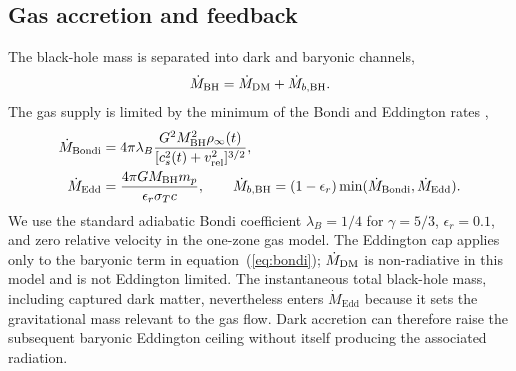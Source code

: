 \documentclass[11pt]{article}
\newcommand{\Bondi}{\mathrm{Bondi}}
\newcommand{\Edd}{\mathrm{Edd}}
\begin{document}
\subsection{Gas accretion and feedback}

The black-hole mass is separated into dark and baryonic channels,
\begin{equation}
 \dot M_{\rm BH}=\dot M_{\rm DM}+\dot M_{b,{\rm BH}} .
\end{equation}
The gas supply is limited by the minimum of the Bondi and Eddington rates \citep{Bondi1952},
\begin{align}
 \dot M_{\Bondi} &=4\pi\lambda_B\frac{G^2M_{\rm BH}^2\rho_{\infty}(t)}{[c_s^2(t)+v_{\rm rel}^2]^{3/2}}, \\
 \dot M_{\Edd}&=\frac{4\pi G M_{\rm BH}m_p}{\epsilon_r\sigma_T c},\qquad
 \dot M_{b,{\rm BH}}=(1-\epsilon_r)\min(\dot M_{\Bondi},\dot M_{\Edd}) .
 \label{eq:bondi}
\end{align}
We use the standard adiabatic Bondi coefficient $\lambda_B=1/4$ for $\gamma=5/3$, $\epsilon_r=0.1$, and zero relative velocity in the one-zone gas model.  The Eddington cap applies only to the baryonic term in equation~(\ref{eq:bondi}); $\dot M_{\rm DM}$ is non-radiative in this model and is not Eddington limited.  The instantaneous total black-hole mass, including captured dark matter, nevertheless enters $\dot M_{\Edd}$ because it sets the gravitational mass relevant to the gas flow.  Dark accretion can therefore raise the subsequent baryonic Eddington ceiling without itself producing the associated radiation.
\end{document}
